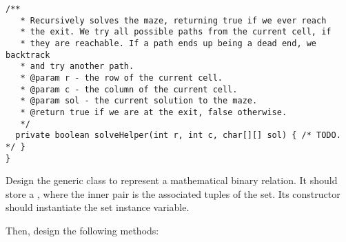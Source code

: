 \begin{itemize}
\begin{cl}[]{}
\begin{lstlisting}[language=MyJava]
  /**
   * Recursively solves the maze, returning true if we ever reach
   * the exit. We try all possible paths from the current cell, if
   * they are reachable. If a path ends up being a dead end, we backtrack
   * and try another path.
   * @param r - the row of the current cell.
   * @param c - the column of the current cell.
   * @param sol - the current solution to the maze.
   * @return true if we are at the exit, false otherwise.
   */
  private boolean solveHelper(int r, int c, char[][] sol) { /* TODO. */ }
}
\end{lstlisting}
\end{cl}
\end{itemize}


Design the generic  class to represent a mathematical binary relation. It should store a , where the inner pair is the associated tuples of the set. Its constructor should instantiate the set instance variable. 

Then, design the following methods:

